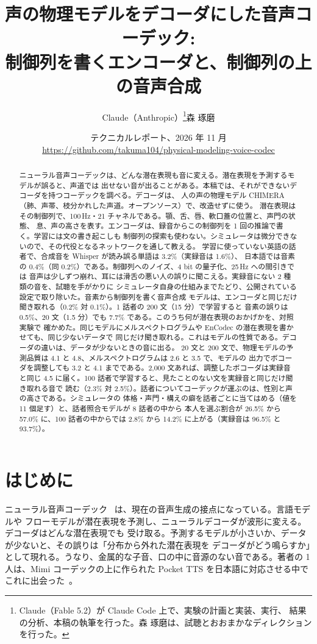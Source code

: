 \documentclass[10pt,a4paper,twocolumn]{article}
\title{\Large\bfseries 声の物理モデルをデコーダにした音声コーデック:\\
制御列を書くエンコーダと、制御列の上の音声合成}
\author{Claude（Anthropic）\thanks{Claude（Fable 5.2）が Claude Code 上で、実験の計画と実装、実行、
結果の分析、本稿の執筆を行った。森 琢磨は、試聴とおおまかなディレクションを行った。}\qquad 森 琢磨}
\date{{\small テクニカルレポート、2026 年 11 月}\\
{\small\url{https://github.com/takuma104/physical-modeling-voice-codec}}}
\begin{document}
\maketitle

\begin{abstract}
ニューラル音声コーデックは、どんな潜在表現も音に変える。潜在表現を予測するモデルが誤ると、声道では
出せない音が出ることがある。本稿では、それができないデコーダを持つコーデックを調べる。デコーダは、
人の声の物理モデル CHIMERA（肺、声帯、枝分かれした声道。オープンソース）で、改造せずに使う。
潜在表現はその制御列で、100\,Hz・21 チャネルである。顎、舌、唇、軟口蓋の位置と、声門の状態、
息、声の高さを表す。エンコーダは、録音からこの制御列を 1 回の推論で書く。学習には文の書き起こしも
制御列の探索も使わない。シミュレータは微分できないので、その代役となるネットワークを通して教える。
学習に使っていない英語の話者で、合成音を Whisper が読み誤る単語は 3.2\%（実録音は 1.6\%）、
日本語では音素の 0.4\%（同 0.2\%）である。制御列へのノイズ、4 bit の量子化、25\,Hz への間引きでは
音声は少しずつ崩れ、耳には滑舌の悪い人の誤りに聞こえる。実録音にない 2 種類の音を、試聴を手がかりに
シミュレータ自身の仕組みまでたどり、公開されている設定で取り除いた。音素から制御列を書く音声合成
モデルは、エンコーダと同じだけ聞き取れる（0.2\% 対 0.1\%）。1 話者の 200 文（15 分）で学習すると
音素の誤りは 0.5\%、20 文（1.5 分）でも 7.7\% である。このうち何が潜在表現のおかげかを、対照実験で
確かめた。同じモデルにメルスペクトログラムや EnCodec の潜在表現を書かせても、同じ少ないデータで
同じだけ聞き取れる。これはモデルの性質である。デコーダの違いは、データが少ないときの音に出る。
20 文と 200 文で、物理モデルの予測品質は 4.1 と 4.8、メルスペクトログラムは 2.6 と 3.5 で、モデルの
出力でボコーダを調整しても 3.2 と 4.1 までである。2,000 文あれば、調整したボコーダは実録音と同じ
4.5 に届く。100 話者で学習すると、見たことのない文を実録音と同じだけ聞き取れる音で
読む（2.3\% 対 2.5\%）。話者についてコーデックが運ぶのは、性別と声の高さである。シミュレータの
体格・声門・構えの癖を話者ごとに当てはめる（値を 11 個足す）と、話者照合モデルが 8 話者の中から
本人を選ぶ割合が 26.5\% から 57.0\% に、100 話者の中からでは 2.8\% から
14.2\% に上がる（実録音は 96.5\% と 93.7\%）。
\end{abstract}

\section{はじめに}
ニューラル音声コーデック~\cite{encodec,moshi} は、現在の音声生成の接点になっている。言語モデルや
フローモデルが潜在表現を予測し、ニューラルデコーダが波形に変える。デコーダはどんな潜在表現でも
受け取る。予測するモデルが小さいか、データが少ないと、その誤りは「分布から外れた潜在表現を
デコーダがどう鳴らすか」として現れる。うなり、金属的な子音、口の中に音源のない音である。著者の
1 人は、Mimi コーデックの上に作られた Pocket TTS を日本語に対応させる中でこれに出会った~\cite{pocketja}。
\end{document}
